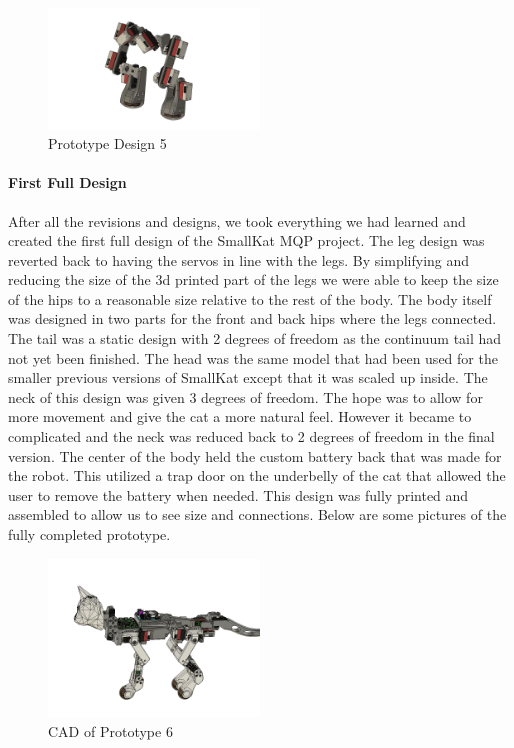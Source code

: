         \begin{figure}[H]
                \centering
                \includegraphics[width=0.5\textwidth]{figures/Prototype5.png}
                \caption{Prototype Design 5}
                \label{fig:Prototype5}
        \end{figure} 
         
        \paragraph{First Full Design}
        After all the revisions and designs, we took everything we had learned and created the first full design of the SmallKat MQP project. The leg design was reverted back to having the servos in line with the legs. By simplifying and reducing the size of the 3d printed part of the legs we were able to keep the size of the hips to a reasonable size relative to the rest of the body. The body itself was designed in two parts for the front and back hips where the legs connected. The tail was a static design with 2 degrees of freedom as the continuum tail had not yet been finished. The head was the same model that had been used for the smaller previous versions of SmallKat except that it was scaled up inside. The neck of this design was given 3 degrees of freedom. The hope was to allow for more movement and give the cat a more natural feel. However it became to complicated and the neck was reduced back to 2 degrees of freedom in the final version. The center of the body held the custom battery back that was made for the robot. This utilized a trap door on the underbelly of the cat that allowed the user to remove the battery when needed. This design was fully printed and assembled to allow us to see size and connections. Below are some pictures of the fully completed prototype.
        
        
         
        \begin{figure}[H]
                \centering
                \includegraphics[width=0.5\textwidth]{figures/Prototype6CAD.png}
                \caption{CAD of Prototype 6}
                \label{fig:Prototype6CAD}
        \end{figure} 
        
